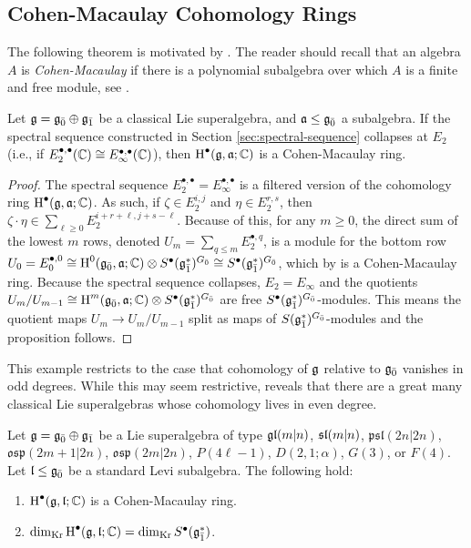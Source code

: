 \subsection{Cohen-Macaulay Cohomology Rings}
\label{sec:cm-H*}

The following theorem is motivated by \cite[Proposition 3.1]{MR3233523}. The reader should recall that an algebra $A$ is \emph{Cohen-Macaulay} if there is a polynomial subalgebra over which $A$ is a finite and free module, see \cite[\S 5.4]{MR1634407}.

\begin{proposition}
  \label{prop:collapse-CM}
  Let $\g = \even{\g} \oplus \odd{\g}$ be a classical Lie superalgebra, and $\a \leq \even{\g}$ a subalgebra. If the spectral sequence constructed in Section \ref{sec:spectral-sequence} collapses at $E_2$ (i.e., if $E_2^{\bullet,\bullet}(\CC) \cong E_\infty^{\bullet,\bullet}(\CC)$), then $\H^\bullet(\g,\a;\CC)$ is a Cohen-Macaulay ring.
\end{proposition}
\begin{proof}
  The spectral sequence $E_2^{\bullet,\bullet} = E_\infty^{\bullet,\bullet}$ is a filtered version of the cohomology ring $\H^\bullet(\g,\a;\CC)$. As such, if $\zeta \in E_2^{i,j}$ and $\eta \in E_2^{r,s}$, then $\zeta \cdot \eta \in \sum_{\ell \geq 0} E_2^{i + r + \ell, j + s - \ell}$. Because of this, for any $m \geq 0$, the direct sum of the lowest $m$ rows, denoted $U_m = \sum_{q \leq m} E_2^{\bullet,q}$, is a module for the bottom row $U_0 = E_0^{\bullet,0} \cong \H^0(\even{\g},\a;\CC) \otimes S^\bullet(\odd{\g}^*)^{\even{G}} \cong S^\bullet(\odd{\g}^*)^{\even{G}}$, which by \cite{MR0347810} is a Cohen-Macaulay ring. Because the spectral sequence collapses, $E_2 = E_\infty$ and the quotients $U_m / U_{m-1} \cong \H^m(\even{\g},\a;\CC) \otimes S^\bullet(\odd{\g}^*)^{\even{G}}$ are free $S^\bullet(\odd{\g}^*)^{\even{G}}$-modules. This means the quotient maps $U_m \to U_m / U_{m-1}$ split as maps of $S(\odd{\g}^*)^{\even{G}}$-modules and the proposition follows.
\end{proof}

This example restricts to the case that cohomology of $\g$ relative to $\even{\g}$ vanishes in odd degrees. While this may seem restrictive, \cite[Table 1]{BKN-1} reveals that there are a great many classical Lie superalgebras whose cohomology lives in even degree.

\begin{corollary}
  Let $\g = \even{\g} \oplus \odd{\g}$ be a Lie superalgebra of type $\gl(m|n)$, $\sl(m|n)$, $\mathfrak{psl}(2n|2n)$, $\mathfrak{osp}(2m+1|2n)$, $\mathfrak{osp}(2m|2n)$, $P(4\ell - 1)$, $D(2,1;\alpha)$, $G(3)$, or $F(4)$. Let $\l \leq \even{\g}$ be a standard Levi subalgebra. The following hold:
  \begin{enumerate}[\indent\rm(a)]
  \item $\H^\bullet(\g,\l;\CC)$ is a Cohen-Macaulay ring.
  \item $\krdim \H^\bullet(\g,\l;\CC) = \krdim S^\bullet(\odd{\g}^*)$.
  \end{enumerate}
\end{corollary}


